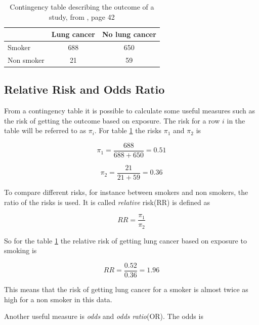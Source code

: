 \documentclass[10pt,a4paper]{report}
\begin{document}
\begin{table}[h]
\begin{tabular}{| l c c |}
  \hline
  & Lung cancer & No lung cancer\\
  \hline
  Smoker & 688 & 650 \\
  Non smoker & 21 & 59 \\
  \hline  
\end{tabular}
\caption{Contingency table describing the outcome of a study, from \cite{agresti_categorical}, page 42}
\label{table:contingency_table}
\end{table}

\subsection{Relative Risk and Odds Ratio}
\label{rr_or}
From a contingency table it is possible to calculate some useful measures such as the risk of getting the outcome based on exposure. The risk for a row $i$ in the table will be referred to as $\pi_i$. For table \ref{table:contingency_table} the risks $\pi_1$ and $\pi_2$ is

\begin{equation}
\pi_1=\frac{688}{688+650}=0.51
\end{equation}

\begin{equation}
\pi_2=\frac{21}{21+59}=0.36
\end{equation}

To compare different risks, for instance between smokers and non smokers, the ratio of the risks is used\cite{agresti_categorical}. It is called \emph{relative} risk(RR) is defined as\cite{agresti_categorical} 

\begin{equation}
RR=\frac{\pi_1}{\pi_2}
\end{equation}

So for the table \ref{table:contingency_table} the relative risk of getting lung cancer based on exposure to smoking is

\begin{equation}
RR=\frac{0.52}{0.36}=1.96
\end{equation}

This means that the risk of getting lung cancer for a smoker is almost twice as high for a non smoker in this data.

Another useful measure is \emph{odds} and \emph{odds ratio}(OR). The odds is\cite{agresti_categorical} 
\end{document}
